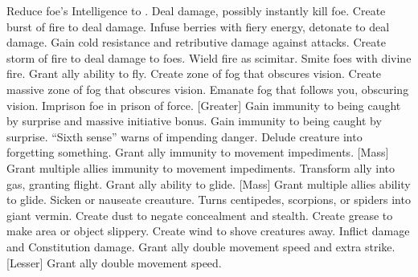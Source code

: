     {Reduce foe's Intelligence to .}
    {Deal damage, possibly instantly kill foe.}
    {Create burst of fire to deal damage.}
    {Infuse berries with fiery energy, detonate to deal damage.}
    {Gain cold resistance and retributive damage against attacks.}
    {Create storm of fire to deal damage to foes.}
    {Wield fire as scimitar.}
    {Smite foes with divine fire.}
    {Grant ally ability to fly.}
    {Create zone of fog that obscures vision.}
    {Create massive zone of fog that obscures vision.}
    {Emanate fog that follows you, obscuring vision.}
    {Imprison foe in prison of force.}
[Greater]
    {Gain immunity to being caught by surprise and massive initiative bonus.}
    {Gain immunity to being caught by surprise.}
    {``Sixth sense'' warns of impending danger.}
    {Delude creature into forgetting something.}
    {Grant ally immunity to movement impediments.}
[Mass]
    {Grant multiple allies immunity to movement impediments.}
    {Transform ally into gas, granting flight.}
    {Grant ally ability to glide.}
[Mass]
    {Grant multiple allies ability to glide.}
    {Sicken or nauseate creauture.}
    {Turns centipedes, scorpions, or spiders into giant vermin.}
    {Create dust to negate concealment and stealth.}
    {Create grease to make area or object slippery.}
    {Create wind to shove creatures away.}
    {Inflict damage and Constitution damage.}
    {Grant ally double movement speed and extra strike.}
[Lesser]
    {Grant ally double movement speed.}
